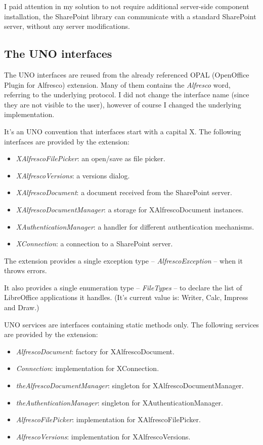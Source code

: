 I paid attention in my solution to not require additional server-side component
installation, the SharePoint library can communicate with a standard SharePoint
server, without any server modifications.

\subsection{The UNO interfaces}

The UNO interfaces are reused from the already referenced OPAL (OpenOffice
Plugin for Alfresco) extension. Many of them contains the \emph{Alfresco} word,
referring to the underlying protocol. I did not change the interface name
(since they are not visible to the user), however of course I changed the
underlying implementation.

It's an UNO convention that interfaces start with a capital X. The following
interfaces are provided by the extension:

\begin{itemize}
\item \emph{XAlfrescoFilePicker}: an open/save as file picker.
\item \emph{XAlfrescoVersions}: a versions dialog.
\item \emph{XAlfrescoDocument}: a document received from the
SharePoint server.
\item \emph{XAlfrescoDocumentManager}: a storage for XAlfrescoDocument instances.
\item \emph{XAuthenticationManager}: a handler for different authentication mechanisms.
\item \emph{XConnection}: a connection to a SharePoint server.
\end{itemize}

The extension provides a single exception type -- \emph{AlfrescoException} --
when it throws errors.

It also provides a single enumeration type -- \emph{FileTypes} -- to declare
the list of LibreOffice applications it handles. (It's current value is:
Writer, Calc, Impress and Draw.)

UNO services are interfaces containing static methods only.  The following
services are provided by the extension:

\begin{itemize}
\item \emph{AlfrescoDocument}: factory for XAlfrescoDocument.
\item \emph{Connection}: implementation for XConnection.
\item \emph{theAlfrescoDocumentManager}: singleton for XAlfrescoDocumentManager.
\item \emph{theAuthenticationManager}: singleton for XAuthenticationManager.
\item \emph{AlfrescoFilePicker}: implementation for XAlfrescoFilePicker.
\item \emph{AlfrescoVersions}: implementation for XAlfrescoVersions.
\end{itemize}

